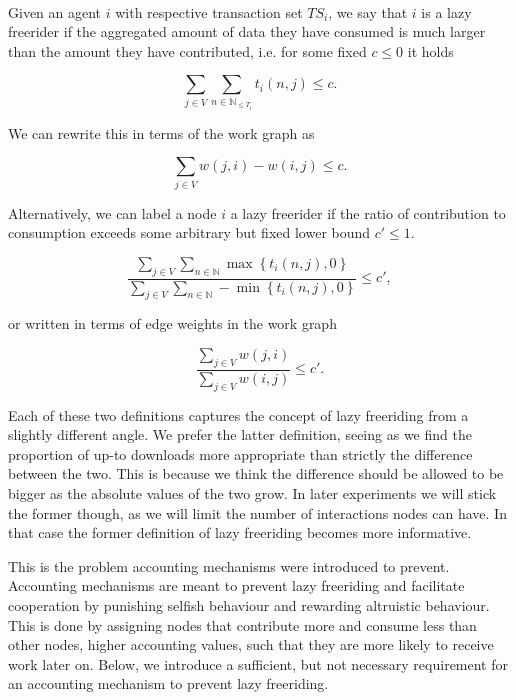 \begin{definition}\ \\
\label{def:Lazy Freeriding}
\noindent{}Given an agent $i$ with respective transaction set $TS_i$, we say that $i$ is a lazy freerider if the aggregated amount of data they have consumed is much larger than the amount they have contributed, i.e. for some fixed $c\leq{}0$ it holds

\[
\sum\limits_{j\in{}V}\sum\limits_{n\in\mathbb{N}_{\leq{}T_i}}t_i(n,j)\leq{}c.
\]

\noindent{}We can rewrite this in terms of the work graph as

\[
\sum\limits_{j\in{}V}w(j,i) - w(i,j)\leq{}c.
\]

\noindent{}Alternatively, we can label a node $i$ a lazy freerider if the ratio of contribution to consumption exceeds some arbitrary but fixed lower bound $c'\leq{}1$. 

\[
\frac{\sum\limits_{j\in{}V}\sum\limits_{n\in\mathbb{N}}\max\left\lbrace{}t_i(n,j), 0\right\rbrace}{\sum\limits_{j\in{}V}\sum\limits_{n\in\mathbb{N}}-\min\left\lbrace{}t_i(n,j), 0\right\rbrace}\leq{}c',
\]

\noindent{}or written in terms of edge weights in the work graph

\[
\frac{\sum\limits_{j\in{}V}w(j,i)}{\sum\limits_{j\in{}V}w(i,j)}\leq{}c'.
\]

\noindent{}Each of these two definitions captures the concept of lazy freeriding from a slightly different angle. We prefer the latter definition, seeing as we find the proportion of up-to downloads more appropriate than strictly the difference between the two. This is because we think the difference should be allowed to be bigger as the absolute values of the two grow. In later experiments we will stick the former though, as we will limit the number of interactions nodes can have. In that case the former definition of lazy freeriding becomes more informative. \vspace{1em}\\
\end{definition}

\noindent{}This is the problem accounting mechanisms were introduced to prevent. Accounting mechanisms are meant to prevent lazy freeriding and facilitate cooperation by punishing selfish behaviour and rewarding altruistic behaviour. This is done by assigning nodes that contribute more and consume less than other nodes, higher accounting values, such that they are more likely to receive work later on. Below, we introduce a sufficient, but not necessary requirement for an accounting mechanism to prevent lazy freeriding. \vspace{1em}\\

